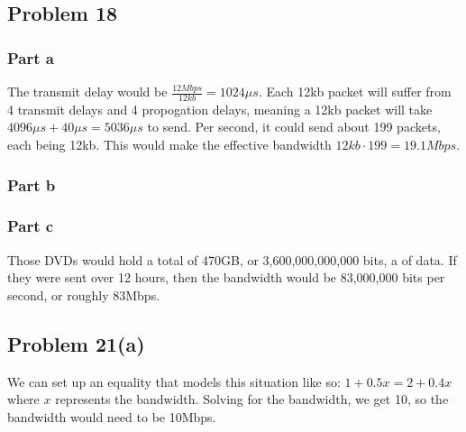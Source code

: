\documentclass{article}%
\begin{document}
\subsection*{Problem 18}

\subsubsection*{Part a}

The transmit delay would be $\frac{12Mbps}{12kb} = 1024\mu s$. Each 12kb packet will suffer from 4 transmit delays and 4
propogation delays, meaning a 12kb packet will take $4096\mu s + 40\mu s = 5036\mu s$ to send. Per second, it could send about
199 packets, each being 12kb. This would make the effective bandwidth $12kb \cdot 199 = 19.1Mbps$.

\subsubsection*{Part b}


\subsubsection*{Part c}

Those DVDs would hold a total of 470GB, or 3,600,000,000,000 bits, a of data. If they were sent over 12 hours, then the bandwidth
would be 83,000,000 bits per second, or roughly 83Mbps.


\subsection*{Problem 21(a)}

We can set up an equality that models this situation like so: $1 + 0.5x = 2 + 0.4x$ where $x$ represents the bandwidth. Solving for the
bandwidth, we get 10, so the bandwidth would need to be 10Mbps.
\end{document}
